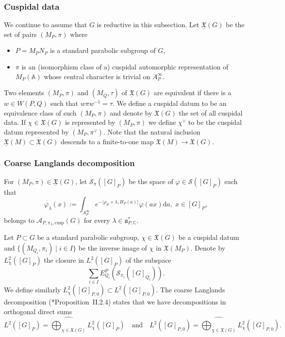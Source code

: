 \documentclass[letterpaper,11pt]{amsart}
\newcommand{\fa}{\mathfrak{a}}
\newcommand{\fX}{\mathfrak{X}}
\newcommand{\bA}{\mathbb{A}}
\newcommand{\C}{\mathbb{C}}
\newcommand{\cA}{\mathcal{A}}
\newcommand{\cS}{\mathcal{S}}
\newcommand{\rd}{\mathrm{d}}
\newcommand{\<}{\negthickspace}
\theoremstyle{definition}
\theoremstyle{plain}
\theoremstyle{remark}
\numberwithin{equation}{section}
\begin{document}
\subsubsection{Cuspidal data}
We continue to assume that $G$ is reductive in this subsection. Let $\underline{\fX}(G)$ be the set of pairs $(M_P, \pi)$ where
\begin{itemize}
    \item $P = M_P N_P$ is a standard parabolic subgroup of $G$,
    \item $\pi$ is an (isomorphism class of a) cuspidal automorphic representation of $M_P(\bA)$ whose central character is trivial on $A_P^\infty$.
\end{itemize}
Two elements $(M_P, \pi)$ and $(M_Q, \tau)$ of
$\underline{\fX}(G)$ are equivalent if there
is a $w \in W(P, Q)$ such that $w\pi w^{-1} = \tau$. We define a cuspidal
datum to be an equivalence class of such $(M_P, \pi)$ and denote by $\fX(G)$
the set of all cuspidal data. If $\chi \in \fX(G)$ is represented by $(M_P, \pi)$ we define $\chi^\vee$ to be the cuspidal datum represented by $(M_P, \pi^\vee)$. Note that the natural inclusion $\underline{\fX}(M)
\subset \overline{\fX}(G)$ descends to a finite-to-one map $\fX(M) \to \fX(G)$.

\subsubsection{Coarse Langlands decomposition}
For $(M_P,\pi) \in \underline{\fX}(G)$, let $\cS_\pi([G]_P)$ be the space of $\varphi \in \cS([G]_P)$ such that
\begin{equation*}
    \varphi_\lambda(x):=\int_{A_P^\infty} e^{-\langle \rho_P+\lambda,H_P(a) \rangle} \varphi(ax) \rd a, \; x \in [G]_P,
\end{equation*}
belongs to $\cA_{P,\pi_\lambda,\mathrm{cusp}}(G)$ for every $\lambda \in \fa_{P,\C}^*$.

Let $P \subset G$ be a standard parabolic subgroup, $\chi \in \fX(G)$ be a cuspidal datum and $\{ (M_{Q_i}, \pi_i) \; | \; i \in I\} $ be the inverse image of $\chi$ in $\underline{\fX}(M_P)$. Denote by $L^2_\chi([G]_P)$ the closure in $L^2([G]_P)$ of the subspace
\begin{equation}
\label{eq:pseudo_subspace}
    \sum_{i \in I} E_{Q_i}^P(\cS_{\pi_i}([G]_{Q_i})).
\end{equation}
 We define similarly $L^2_{\chi}([G]_{P,0}) \subset L^2([G]_{P,0})$. The coarse Langlands decomposition (\cite{MW95}*{Proposition~II.2.4}) states that we have decompositions in orthogonal direct sums
\begin{equation*}
    L^2([G]_P)=\widehat{\bigoplus_{\chi \in \fX(G)}}L^2_{\chi}([G]_P) \quad \text{and} \quad L^2([G]_{P,0})=\widehat{\bigoplus_{\chi \in \fX(G)}}L^2_{\chi}([G]_{P,0}).
\end{equation*}
\end{document}
